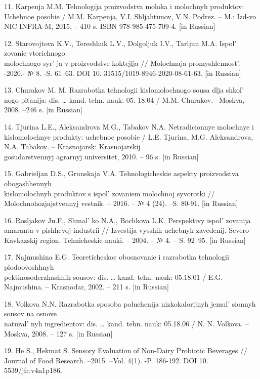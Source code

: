 \begin{references}
11. Karpenja M.M. Tehnologija proizvodstva moloka i molochnyh produktov:
Uchebnoe posobie / M.M. Karpenja, V.I. Shljahtunov, V.N. Podrez. -- M.:
Izd-vo NIC INFRA-M, 2015. -- 410 s. ISBN 978-985-475-709-4. {[}in
Russian{]}

12. Starovojtova K.V., Tereshhuk L.V., Dolgoljuk I.V., Tarljun M.A.
Ispol' zovanie vtorichnogo \\molochnogo
syr' ja v proizvodstve koktejlja // Molochnaja
promyshlennost'. -2020.- № 8. -S. 61--63. DOI
10. 31515/1019-8946-2020-08-61-63. {[}in Russian{]}

13. Churakov M. M. Razrabotka tehnologii kislomolochnogo sousa dlja
shkol' nogo pitanija: dis. \ldots{} kand. tehn. nauk:
05. 18.04 / M.M. Churakov. --Moskva, 2008. --246 s. {[}in Russian{]}

14. Tjurina L.E., Aleksandrova M.G., Tabakov N.A. Netradicionnye
molochnye i kislomolochnye produkty: uchebnoe posobie / L.E. Tjurina,
M.G. Aleksandrova, N.A. Tabakov. -- Krasnojarsk: Krasnojarskij\\
gosudarstvennyj agrarnyj universitet, 2010. -- 96 s. {[}in Russian{]}

15. Gabrieljan D.S., Grunskaja V.A. Tehnologicheskie aspekty proizvodstva
obogashhennyh \\kislomolochnyh produktov s ispol' zovaniem
molochnoj syvorotki // Molochnohozjajstvennyj vestnik. -- 2016. -- № 4
(24). --S. 80-91. {[}in Russian{]}

16. Rosljakov Ju.F., Shmal' ko N.A., Bochkova L.K.
Perspektivy ispol' zovanija amaranta v pishhevoj
industrii // Izvestija vysshih uchebnyh zavedenij. Severo-Kavkazskij
region. Tehnicheskie nauki. -- 2004. -- № 4. -- S. 92--95. {[}in
Russian{]}

17. Najmushina E.G. Teoreticheskoe obosnovanie i razrabotka tehnologii
plodoovoshhnyh \\pektinosoderzhashhih sousov: dis. \ldots{} kand. tehn.
nauk: 05.18.01 / E.G. Najmushina. -- Krasnodar, 2002. -- 211 s. {[}in
Russian{]}

18. Volkova N.N. Razrabotka sposoba poluchenija nizkokalorijnyh
jemul' sionnyh sousov na osnove\\
natural' nyh ingredientov: dis. \ldots{} kand. tehn.
nauk: 05.18.06 / N. N. Volkova. -- Moskva, 2008. -- 127 s. {[}in
Russian{]}

19. He S., Hekmat S. Sensory Evaluation of Non-Dairy Probiotic Beverages
// Journal of Food Research. --2015. --Vol. 4(1). -P. 186-192. DOI
10. 5539/jfr.v4n1p186.


\end{references}
